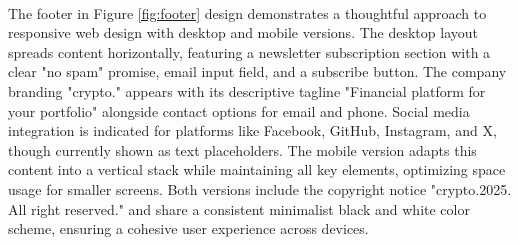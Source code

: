 \paragraph{}The footer in Figure \ref{fig:footer} design demonstrates a thoughtful approach to responsive web design with desktop and mobile versions. The desktop layout spreads content horizontally, featuring a newsletter subscription section with a clear "no spam" promise, email input field, and a subscribe button. The company branding "crypto." appears with its descriptive tagline "Financial platform for your portfolio" alongside contact options for email and phone. Social media integration is indicated for platforms like Facebook, GitHub, Instagram, and X, though currently shown as text placeholders. The mobile version adapts this content into a vertical stack while maintaining all key elements, optimizing space usage for smaller screens. Both versions include the copyright notice "crypto.2025. All right reserved." and share a consistent minimalist black and white color scheme, ensuring a cohesive user experience across devices.
